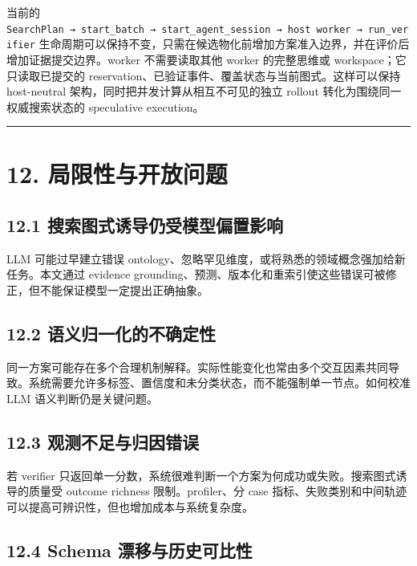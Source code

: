 \documentclass[
  11pt]{ctexart}
\begin{document}
当前的
\texttt{SearchPlan\ →\ start\_batch\ →\ start\_agent\_session\ →\ host\ worker\ →\ run\_verifier}
生命周期可以保持不变，只需在候选物化前增加方案准入边界，并在评价后增加证据提交边界。worker
不需要读取其他 worker 的完整思维或 workspace；它只读取已提交的
reservation、已验证事件、覆盖状态与当前图式。这样可以保持 host-neutral
架构，同时把并发计算从相互不可见的独立 rollout
转化为围绕同一权威搜索状态的 speculative execution。

\begin{center}\rule{0.5\linewidth}{0.5pt}\end{center}

\section{12.
局限性与开放问题}\label{ux5c40ux9650ux6027ux4e0eux5f00ux653eux95eeux9898}

\subsection{12.1
搜索图式诱导仍受模型偏置影响}\label{ux641cux7d22ux56feux5f0fux8bf1ux5bfcux4ecdux53d7ux6a21ux578bux504fux7f6eux5f71ux54cd}

LLM 可能过早建立错误
ontology、忽略罕见维度，或将熟悉的领域概念强加给新任务。本文通过
evidence
grounding、预测、版本化和重索引使这些错误可被修正，但不能保证模型一定提出正确抽象。

\subsection{12.2
语义归一化的不确定性}\label{ux8bedux4e49ux5f52ux4e00ux5316ux7684ux4e0dux786eux5b9aux6027}

同一方案可能存在多个合理机制解释。实际性能变化也常由多个交互因素共同导致。系统需要允许多标签、置信度和未分类状态，而不能强制单一节点。如何校准
LLM 语义判断仍是关键问题。

\subsection{12.3
观测不足与归因错误}\label{ux89c2ux6d4bux4e0dux8db3ux4e0eux5f52ux56e0ux9519ux8bef}

若 verifier
只返回单一分数，系统很难判断一个方案为何成功或失败。搜索图式诱导的质量受
outcome richness 限制。profiler、分 case
指标、失败类别和中间轨迹可以提高可辨识性，但也增加成本与系统复杂度。

\subsection{12.4 Schema
漂移与历史可比性}\label{schema-ux6f02ux79fbux4e0eux5386ux53f2ux53efux6bd4ux6027}
\end{document}
